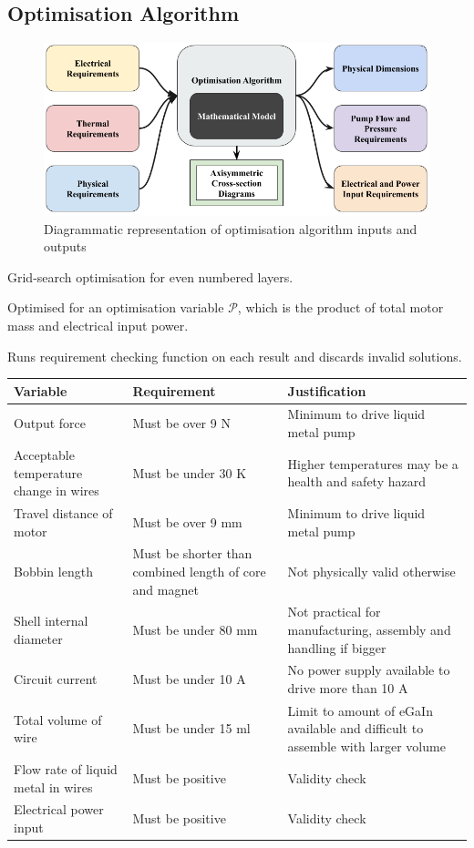 \documentclass[a4paper,12pt]{article}
\begin{document}
\subsection{Optimisation Algorithm}
\begin{figure}[h] \label{fg:optiAlgo}
	\centering
	\includegraphics[scale=0.4]{optiAlgro.png}
	\caption{Diagrammatic representation of optimisation algorithm inputs and outputs}
\end{figure}

Grid-search optimisation for even numbered layers.

Optimised for an optimisation variable $\mathcal{P}$, which is the product of total motor mass and electrical input power.

Runs requirement checking function on each result and discards invalid solutions.

\begin{center}
	\begin{tabular}{M | M | M} 
		\textbf{Variable} & \textbf{Requirement} & \textbf{Justification} \\ [0.5ex] 
		\hline\hline
		Output force & Must be over 9 N & Minimum to drive liquid metal pump \\
		\hline
		Acceptable temperature change in wires & Must be under 30 K & Higher temperatures may be a health and safety hazard \\
		\hline
		Travel distance of motor & Must be over 9 mm & Minimum to drive liquid metal pump \\ 
		\hline
		Bobbin length & Must be shorter than combined length of core and magnet & Not physically valid otherwise \\ 
		\hline
		Shell internal diameter & Must be under 80 mm & Not practical for manufacturing, assembly and handling if bigger \\ 
		\hline
		Circuit current & Must be under 10 A & No power supply available to drive more than 10 A \\ 
		\hline
		Total volume of wire & Must be under 15 ml & Limit to amount of eGaIn available and difficult to assemble with larger volume \\ 
		\hline
		Flow rate of liquid metal in wires & Must be positive & Validity check \\ 
		\hline
		Electrical power input & Must be positive & Validity check \\ 
		\hline
	\end{tabular}
\end{center}
\end{document}
